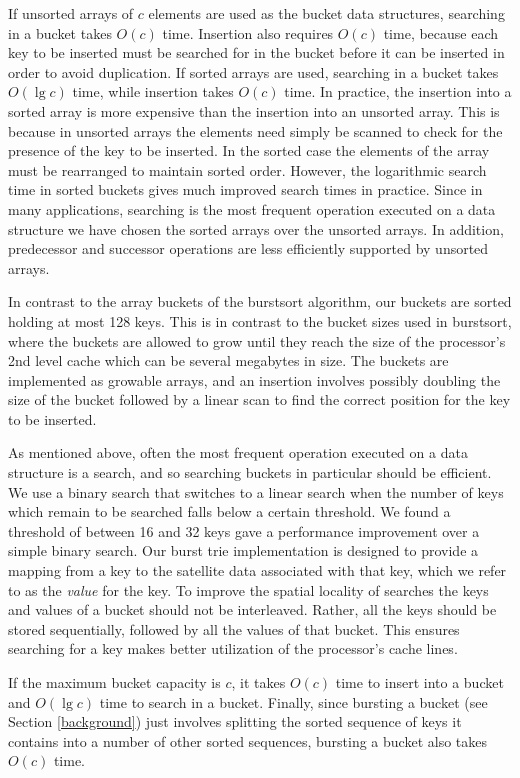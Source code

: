 \documentclass[]{acmtrans2m}
\begin{document}
If unsorted arrays of $c$ elements are used as the bucket data structures, searching in a bucket takes $O(c)$ time.
Insertion also requires $O(c)$ time, because each key to be inserted must be searched for in the bucket
before it can be inserted in order to avoid duplication. If sorted arrays are used, searching in a bucket takes $O(\lg c)$ time, while insertion
takes $O(c)$ time. In practice, the insertion into a sorted array is more expensive than the
insertion into an unsorted array. This is because in unsorted arrays the elements need simply be scanned to
check for the presence of the key to be inserted. In the sorted case the elements of the array must be rearranged
to maintain sorted order. However, the logarithmic search time in sorted buckets gives much improved search
times in practice. Since in many applications, searching is the most frequent operation executed on a data structure
we have chosen the sorted arrays over the unsorted arrays. In addition, predecessor and successor operations are
less efficiently supported by unsorted arrays.

In contrast to the array buckets of the burstsort algorithm, our buckets are sorted holding at most 128 keys.
This is in contrast to the bucket sizes used in burstsort, where the buckets are allowed to grow until they reach the size of the processor's 2nd level cache
which can be several megabytes in size. The buckets are implemented as growable
arrays, and an insertion involves possibly doubling the size of the bucket followed by a linear scan
to find the correct position for the key to be inserted. 

As mentioned above, often the most frequent operation executed on a data structure is a search, and so searching buckets in
particular should be efficient. We use a binary search that switches to a linear search when the number
of keys which remain to be searched falls below a certain threshold. We found a threshold of between
16 and 32 keys gave a performance improvement over a simple binary search. Our burst trie implementation
is designed to provide a mapping from a key to the satellite data associated with that key, which we 
refer to as the \textit{value} for the key.  
To improve the spatial locality of searches the keys and values of a bucket should not be interleaved.
Rather, all the keys should be stored sequentially, 
followed by all the values of that bucket. This ensures searching for a key makes better utilization of 
the processor's cache lines.

If the maximum bucket capacity is $c$, it takes $O(c)$ time to insert into
a bucket and $O(\lg c)$ time to search in a bucket. Finally, since bursting a bucket (see Section \ref{background}) 
just involves splitting the sorted sequence of keys it contains into a number of other sorted
sequences, bursting a bucket also takes $O(c)$ time.
\end{document}
